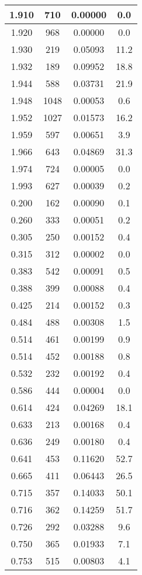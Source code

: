\begin{longtable}{c | c | c | c}
1.910 &  710 & 0.00000 &  0.0 \\ \hline 
1.920 &  968 & 0.00000 &  0.0 \\ \hline 
1.930 &  219 & 0.05093 & 11.2 \\ \hline 
1.932 &  189 & 0.09952 & 18.8 \\ \hline 
1.944 &  588 & 0.03731 & 21.9 \\ \hline 
1.948 & 1048 & 0.00053 &  0.6 \\ \hline 
1.952 & 1027 & 0.01573 & 16.2 \\ \hline 
1.959 &  597 & 0.00651 &  3.9 \\ \hline 
1.966 &  643 & 0.04869 & 31.3 \\ \hline 
1.974 &  724 & 0.00005 &  0.0 \\ \hline 
1.993 &  627 & 0.00039 &  0.2 \\ \hline 
0.200 &  162 & 0.00090 &  0.1 \\ \hline 
0.260 &  333 & 0.00051 &  0.2 \\ \hline 
0.305 &  250 & 0.00152 &  0.4 \\ \hline 
0.315 &  312 & 0.00002 &  0.0 \\ \hline 
0.383 &  542 & 0.00091 &  0.5 \\ \hline 
0.388 &  399 & 0.00088 &  0.4 \\ \hline 
0.425 &  214 & 0.00152 &  0.3 \\ \hline 
0.484 &  488 & 0.00308 &  1.5 \\ \hline 
0.514 &  461 & 0.00199 &  0.9 \\ \hline 
0.514 &  452 & 0.00188 &  0.8 \\ \hline 
0.532 &  232 & 0.00192 &  0.4 \\ \hline 
0.586 &  444 & 0.00004 &  0.0 \\ \hline 
0.614 &  424 & 0.04269 & 18.1 \\ \hline 
0.633 &  213 & 0.00168 &  0.4 \\ \hline 
0.636 &  249 & 0.00180 &  0.4 \\ \hline 
0.641 &  453 & 0.11620 & 52.7 \\ \hline 
0.665 &  411 & 0.06443 & 26.5 \\ \hline 
0.715 &  357 & 0.14033 & 50.1 \\ \hline 
0.716 &  362 & 0.14259 & 51.7 \\ \hline 
0.726 &  292 & 0.03288 &  9.6 \\ \hline 
0.750 &  365 & 0.01933 &  7.1 \\ \hline 
0.753 &  515 & 0.00803 &  4.1 \\ \hline 

\end{longtable}

